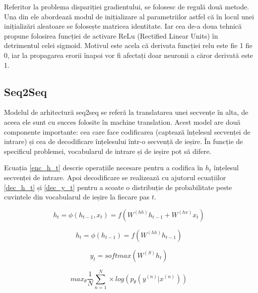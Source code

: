 Referitor la problema dispariției gradientului, se folosesc de regulă două metode. Una din ele abordează modul de inițializare al parametriilor astfel că în locul unei inițializări aleatoare se folosește matricea identitate. Iar cea de-a doua tehnică propune folosirea funcției de activare ReLu (Rectified Linear Units) în detrimentul celei sigmoid. Motivul este acela că derivata funcției relu este fie 1 fie 0, iar la propagarea erorii înapoi vor fi afectați doar neuronii a căror derivată este 1.

\subsection{Seq2Seq}

Modelul de arhitectură seq2seq se referă la translatarea unei secvențe în alta, de aceea ele sunt cu succes folosite în machine translation.
Acest model are două componente importante: cea care face codificarea (captează înțelesul secvenței de intrare) și cea de decodificare înțelesului într-o secvență de ieșire. În funcție de specificul problemei, vocabularul de intrare și de ieșire pot să difere.

Ecuația \ref{enc_h_t} descrie operațiile necesare pentru a codifica în $h_t$ înțelesul secvenței de intrare. Apoi decodificare se realizează cu ajutorul ecuațiilor \ref{dec_h_t} și \ref{dec_y_t} pentru a scoate o distribuție de probabilitate peste cuvintele din vocabularul de ieșire la fiecare pas $t$.


\begin{equation}
h_t = \phi(h_{t-1}, x_t) = f(W^{(hh)} h_{t-1} + W^{(hx)} x_t)
\label{enc_h_t}
\end{equation}

\begin{equation}
h_t = \phi(h_{t-1}) = f(W^{(hh)} h_{t-1})
\label{dec_h_t}
\end{equation}

\begin{equation}
y_t = softmax(W^{(S)} h_t) 
\label{dec_y_t}
\end{equation}

\begin{equation}
max_{\theta}\frac{1}{N} \sum_{n=1}^{N}\times log(p_\theta(y^{(n)}|x^{(n)}))
\label{seq2seq_loss}
\end{equation}


